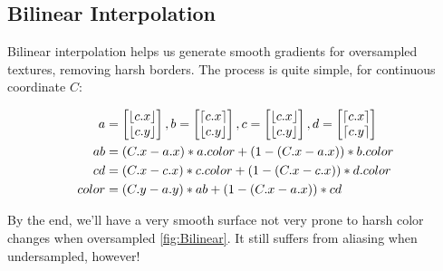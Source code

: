 \documentclass[twocolumn, 12pt]{article}
\DeclarePairedDelimiter\ceil{\lceil}{\rceil}
\DeclarePairedDelimiter\floor{\lfloor}{\rfloor}
\begin{document}
\subsection{Bilinear Interpolation}
\label{sec:orgd9673c7}

Bilinear interpolation helps us generate smooth gradients for
oversampled textures, removing harsh borders. The process is quite
simple, for continuous coordinate \(C\):

\begin{align*}
  a &= \begin{bmatrix}
    \floor{c.x} \\
    \floor{c.y}
  \end{bmatrix},
  b = \begin{bmatrix}
    \ceil{c.x} \\
    \floor{c.y}
  \end{bmatrix},
  c = \begin{bmatrix}
    \floor{c.x} \\
    \floor{c.y}
  \end{bmatrix},
  d = \begin{bmatrix}
    \ceil{c.x} \\
    \ceil{c.y}
  \end{bmatrix} \\
  ab &= (C.x - a.x) * a.color + (1 - (C.x - a.x)) * b.color \\
  cd &= (C.x - c.x) * c.color + (1 - (C.x - c.x)) * d.color \\
  color &= (C.y - a.y) * ab + (1 - (C.x - a.x)) * cd
\end{align*}

By the end, we'll have a very smooth surface not very prone to
harsh color changes when oversampled \cref{fig:Bilinear}. It still suffers from
aliasing when undersampled, however!
\end{document}
